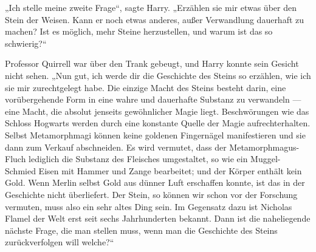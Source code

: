 „Ich stelle meine zweite Frage“, sagte Harry.
„Erzählen sie mir etwas über den Stein der Weisen. Kann er noch etwas anderes, außer Verwandlung dauerhaft zu machen? Ist es möglich, mehr Steine herzustellen, und warum ist das so schwierig?“

Professor Quirrell war über den Trank gebeugt, und Harry konnte sein Gesicht nicht sehen.
„Nun gut, ich werde dir die Geschichte des Steins so erzählen, wie ich sie mir zurechtgelegt habe. Die einzige Macht des Steins besteht darin, eine vorübergehende Form in eine wahre und dauerhafte Substanz zu verwandeln — eine Macht, die absolut jenseits gewöhnlicher Magie liegt. Beschwörungen wie das Schloss Hogwarts werden durch eine konstante Quelle der Magie aufrechterhalten. Selbst Metamorphmagi können keine goldenen Fingernägel manifestieren und sie dann zum Verkauf abschneiden. Es wird vermutet, dass der Metamorphmagus-Fluch lediglich die Substanz des Fleisches umgestaltet, so wie ein Muggel-Schmied Eisen mit Hammer und Zange bearbeitet; und der Körper enthält kein Gold. Wenn Merlin selbst Gold aus dünner Luft erschaffen konnte, ist das in der Geschichte nicht überliefert. Der Stein, so können wir schon vor der Forschung vermuten, muss also ein sehr altes Ding sein. Im Gegensatz dazu ist Nicholas Flamel der Welt erst seit sechs Jahrhunderten bekannt. Dann ist die naheliegende nächste Frage, die man stellen muss, wenn man die Geschichte des Steins zurückverfolgen will welche?“

